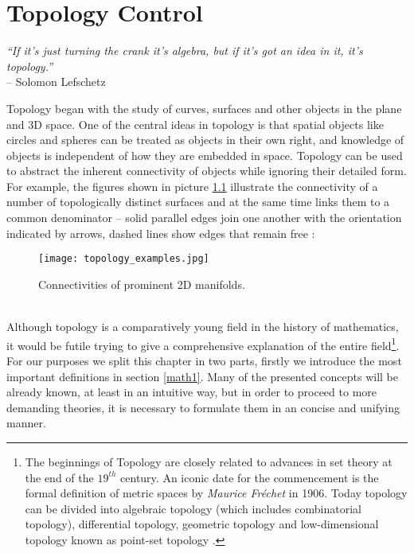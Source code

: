 \chapter{Topology Control}
\label{math0}

\begin{flushright}
\textit{``If it's just turning the crank it's algebra, but if it's got an idea in it, it's topology.''}\\
-- Solomon Lefschetz
\end{flushright}

Topology began with the study of curves, surfaces and other objects in the plane and 3D space.
One of the central ideas in topology is that spatial objects like circles and spheres can be treated as objects in their own right, and knowledge of objects is independent of how they are embedded in space.
Topology can be used to abstract the inherent connectivity of objects while ignoring their detailed form.\\
For example, the figures shown in picture \ref{fig:topology_examples} illustrate the connectivity of a number of topologically distinct surfaces and at the same time links them to a common denominator -- solid parallel edges join one another with the orientation indicated by arrows, dashed lines show edges that remain free \citep[][cf. p.1]{Weisstein2012}:
\begin{figure}[ht]
\centering
\texttt{[image: topology\_examples.jpg]}
\caption{Connectivities of prominent 2D manifolds.}
\label{fig:topology_examples}
\end{figure}\\
Although topology is a comparatively young field in the history of mathematics, it would be futile trying to give a comprehensive explanation of the entire field\footnote{ The beginnings of Topology are closely related to advances in set theory at the end of the $19^{th}$ century. An iconic date for the commencement is the formal definition of metric spaces by \textit{Maurice Fréchet} in 1906. Today topology can be divided into algebraic topology (which includes combinatorial topology), differential topology, geometric topology and low-dimensional topology known as point-set topology \citep[][cf. p.2]{Weisstein2012}.}.\\
For our purposes we split this chapter in two parts, firstly we introduce the most important definitions in section \ref{math1}.
Many of the presented concepts will be already known, at least in an intuitive way, but in order to proceed to more demanding theories, it is necessary to formulate them in an concise and unifying manner.
